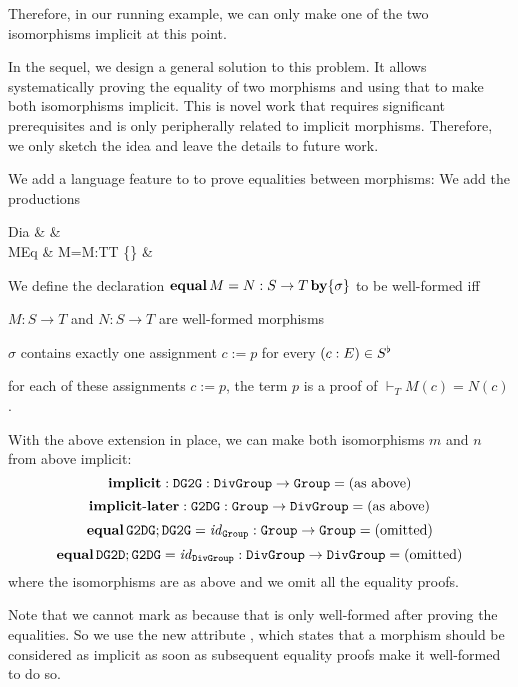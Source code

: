 Therefore, in our running example, we can only make one of the two isomorphisms implicit at this point.

In the sequel, we design a general solution to this problem.
It allows systematically proving the equality of two morphisms and using that to make both isomorphisms implicit.
This is novel work that requires significant prerequisites and is only peripherally related to implicit morphisms.
Therefore, we only sketch the idea and leave the details to future work.

We add a language feature to \mmt to prove equalities between morphisms:
We add the productions
\begin{grammar}
Dia   &   &\\
MEq   &  M=M:T\to T  \{\} &\\
\end{grammar}


We define the declaration $\operatorname{\mathbf{equal}} M=N:S\to T \operatorname{\mathbf{by}} \{\sigma\}$ to be well-formed iff
\begin{compactitem} 
  \item $M:S\to T$ and $N:S\to T$ are well-formed morphisms
  \item $\sigma$ contains exactly one assignment $c:=p$ for every $(c:E)\in S^\flat$
  \item for each of these assignments $c:=p$, the term $p$ is a proof of $\vdash_T M(c)=N(c)$.
\end{compactitem}

\begin{example}[Isomorphisms]
With the above extension in place, we can make both isomorphisms $m$ and $n$ from above implicit:
 \[\operatorname{\mathbf{implicit}}:\operatorname{\mathtt{DG2G}}:\operatorname{\mathtt{DivGroup}}\to\operatorname{\mathtt{Group}}=\text{(as above)}\]
 \[\operatorname{\mathbf{implicit-later}}:\operatorname{\mathtt{G2DG}}:\operatorname{\mathtt{Group}}\to\operatorname{\mathtt{DivGroup}}=\text{(as above)}\]
 \[\operatorname{\mathbf{equal}}\operatorname{\mathtt{G2DG}};\operatorname{\mathtt{DG2G}}=\mathit{id}_{\operatorname{\mathtt{Group}}}:\operatorname{\mathtt{Group}}\to\operatorname{\mathtt{Group}}=\text{(omitted)}\]
 \[\operatorname{\mathbf{equal}}\operatorname{\mathtt{DG2D}};\operatorname{\mathtt{G2DG}}=\mathit{id}_{\operatorname{\mathtt{DivGroup}}}:\operatorname{\mathtt{DivGroup}}\to\operatorname{\mathtt{DivGroup}}=\text{(omitted)}\]
where the isomorphisms are as above and we omit all the equality proofs.

Note that we cannot mark  as  because that is only well-formed after proving the equalities.
So we use the new attribute , which states that a morphism should be considered as implicit as soon as subsequent equality proofs make it well-formed to do so.
\end{example}

